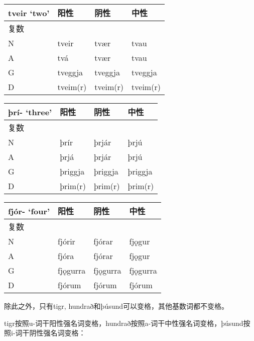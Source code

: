 \begin{longtable}{llll}
    \toprule
    tveir `two‌' & 阳性       & 阴性       & 中性       \\
    \midrule
    \endhead
    \bottomrule
    \endfoot
    复数          &          &          &          \\
    N           & tveir    & tvær     & tvau     \\
    A           & tvá      & tvær     & tvau     \\
    G           & tveggja  & tveggja  & tveggja  \\
    D           & tveim(r) & tveim(r) & tveim(r) \\
\end{longtable}

\begin{longtable}{llll}
    \toprule
    þrí- `three‌' & 阳性      & 阴性      & 中性      \\
    \midrule
    \endhead
    \bottomrule
    \endfoot
    复数           &         &         &         \\
    N            & þrír    & þrjár   & þrjú    \\
    A            & þrjá    & þrjár   & þrjú    \\
    G            & þriggja & þriggja & þriggja \\
    D            & þrim(r) & þrim(r) & þrim(r) \\
\end{longtable}

\begin{longtable}[]{llll}
    \toprule
    fjór- `four‌' & 阳性       & 阴性       & 中性       \\
    \midrule
    \endhead
    \bottomrule
    \endfoot
    复数           &          &          &          \\
    N            & fjórir   & fjórar   & fjǫgur   \\
    A            & fjóra    & fjórar   & fjǫgur   \\
    G            & fjǫgurra & fjǫgurra & fjǫgurra \\
    D            & fjórum   & fjórum   & fjórum   \\
\end{longtable}

除此之外，只有tigr, hundrað和þúsund可以变格，其他基数词都不变格。

tigr按照u-词干阳性强名词变格，hundrað按照a-词干中性强名词变格，þúsund按照i-词干阴性强名词变格：

